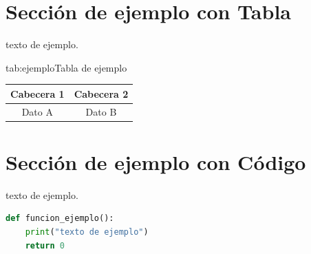 \section{Sección de ejemplo con Tabla}
texto de ejemplo.

\begin{table}{tab:ejemplo}{Tabla de ejemplo}
    \begin{tabular}{|c|c|}
        \hline
        Cabecera 1 & Cabecera 2 \\
        \hline
        Dato A & Dato B \\
        \hline
    \end{tabular}
\end{table}

\section{Sección de ejemplo con Código}
texto de ejemplo.

\begin{lstlisting}[language=Python, caption={Código de ejemplo}, label={code:ejemplo}]
def funcion_ejemplo():
    print("texto de ejemplo")
    return 0
\end{lstlisting}